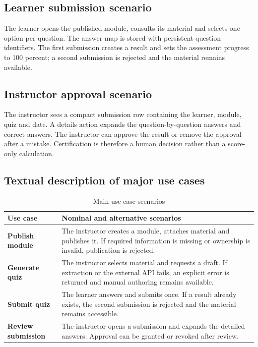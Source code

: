 \subsection{Learner submission scenario}
The learner opens the published module, consults its material and selects one
option per question. The answer map is stored with persistent question
identifiers. The first submission creates a result and sets the assessment
progress to 100 percent; a second submission is rejected and the material
remains available.

\subsection{Instructor approval scenario}
The instructor sees a compact submission row containing the learner, module,
quiz and date. A details action expands the question-by-question answers and
correct answers. The instructor can approve the result or remove the approval
after a mistake. Certification is therefore a human decision rather than a
score-only calculation.

\subsection{Textual description of major use cases}
\begin{table}[H]\centering
\caption{Main use-case scenarios}\label{tab:usecase-scenarios}
\begin{tabularx}{\textwidth}{>{\bfseries}p{}X}
\toprule Use case & Nominal and alternative scenarios\\\midrule
Publish module & The instructor creates a module, attaches material and publishes it. If required information is missing or ownership is invalid, publication is rejected.\\
Generate quiz & The instructor selects material and requests a draft. If extraction or the external API fails, an explicit error is returned and manual authoring remains available.\\
Submit quiz & The learner answers and submits once. If a result already exists, the second submission is rejected and the material remains accessible.\\
Review submission & The instructor opens a submission and expands the detailed answers. Approval can be granted or revoked after review.\\
\bottomrule
\end{tabularx}
\end{table}

